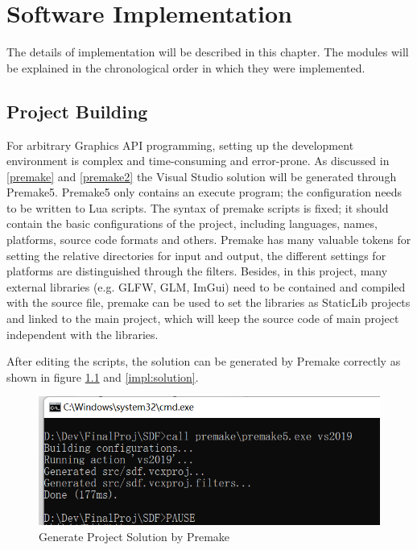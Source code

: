 \chapter{Software Implementation}
\label{chap4}

The details of implementation will be described in this chapter. The modules will be explained in the chronological order in which they were implemented.

\section{Project Building}

For arbitrary Graphics API programming, setting up the development environment is complex and time-consuming and error-prone. As discussed in \ref{premake} and \ref{premake2} the Visual Studio solution will be generated through Premake5. Premake5 only contains an execute program; the configuration needs to be written to Lua scripts. The syntax of premake scripts is fixed; it should contain the basic configurations of the project, including languages, names, platforms, source code formats and others. Premake has many valuable tokens for setting the relative directories for input and output, the different settings for platforms are distinguished through the filters. Besides, in this project, many external libraries (e.g. GLFW, GLM, ImGui) need to be contained and compiled with the source file, premake can be used to set the libraries as StaticLib projects and linked to the main project, which will keep the source code of main project independent with the libraries. 

\hspace*{\fill}

After editing the scripts, the solution can be generated by Premake correctly as shown in figure \ref{impl:premake} and \ref{impl:solution}.

\begin{figure}[htbp]
    \centering
    \includegraphics[width=13cm]{Images/Chap4/project.png}
    \caption{Generate Project Solution by Premake}
    \label{impl:premake}
\end{figure}


